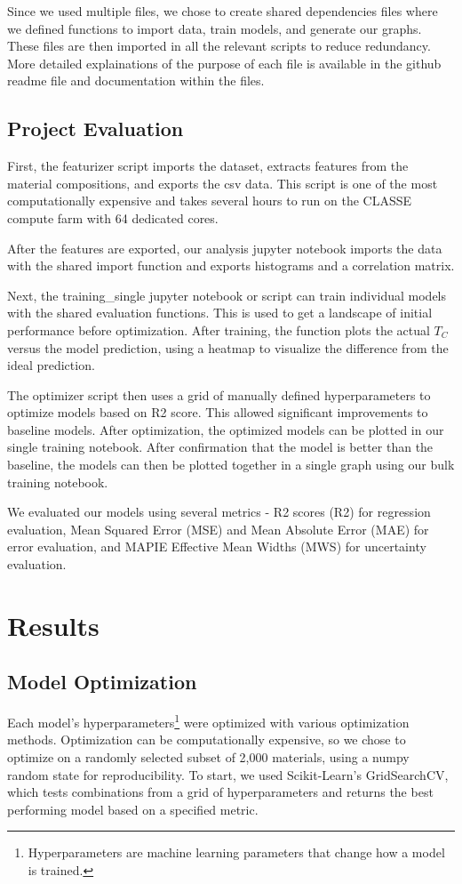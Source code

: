 \documentclass[twocolumn, nofootinbib, secnumarabic, amssymb, nobibnotes, aps, prd]{revtex4-2}
\begin{document}
Since we used multiple files, we chose to create shared dependencies files where we defined functions to import data, train models, and generate our graphs. These files are then imported in all the relevant scripts to reduce redundancy. More detailed explainations of the purpose of each file is available in the github readme file and documentation within the files.

\subsection{Project Evaluation}

First, the featurizer script imports the dataset, extracts features from the material compositions, and exports the csv data. This script is one of the most computationally expensive and takes several hours to run on the CLASSE compute farm with 64 dedicated cores.

After the features are exported, our analysis jupyter notebook imports the data with the shared import function and exports histograms and a correlation matrix. 

Next, the training\_single jupyter notebook or script can train individual models with the shared evaluation functions. This is used to get a landscape of initial performance before optimization. After training, the function plots the actual $T_C$ versus the model prediction, using a heatmap to visualize the difference from the ideal prediction.

The optimizer script then uses a grid of manually defined hyperparameters to optimize models based on R2 score. This allowed significant improvements to baseline models. After optimization, the optimized models can be plotted in our single training notebook. After confirmation that the model is better than the baseline, the models can then be plotted together in a single graph using our bulk training notebook. 

We evaluated our models using several metrics - R2 scores (R2) for regression evaluation, Mean Squared Error (MSE) and Mean Absolute Error (MAE) for error evaluation, and MAPIE Effective Mean Widths (MWS) for uncertainty evaluation.

\section{Results}
\subsection{Model Optimization}
Each model's hyperparameters\footnote{Hyperparameters are machine learning parameters that change how a model is trained.} were optimized with various optimization methods. Optimization can be computationally expensive, so we chose to optimize on a randomly selected subset of 2,000 materials, using a numpy random state for reproducibility. To start, we used Scikit-Learn's GridSearchCV, which tests combinations from a grid of hyperparameters and returns the best performing model based on a specified metric. 
\end{document}
